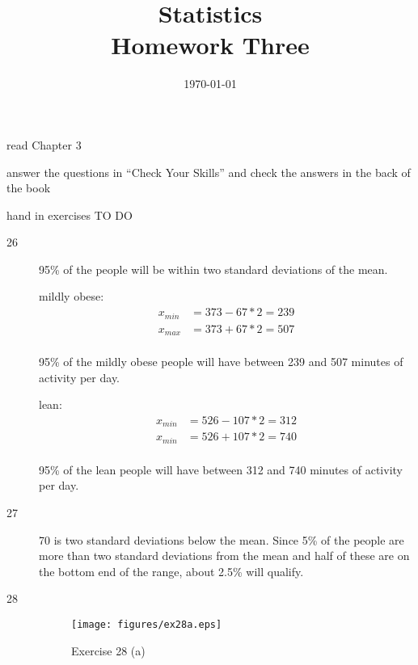 \documentclass{exam}
\author{}
\date{\today}
\title{Statistics \\ Homework Three}
\begin{document}
  \maketitle

  \ifprintanswers
  \else
    \begin{itemize*}
      \item read Chapter 3 
      \item answer the questions in ``Check Your Skills'' and check the answers in the
        back of the book
      \item hand in exercises TO DO
    \end{itemize*}
  \fi

  \ifprintanswers
    \begin{description}
      \item[26] 95\% of the people will be within two standard deviations of the mean.  

        mildly obese:
        \begin{align*}
          x_{min} &= 373 - 67 * 2 = 239 \\
          x_{max} &= 373 + 67 * 2 = 507 \\
        \end{align*}

        95\% of the mildly obese people will have between 239 and 507 minutes of activity
        per day.

        lean:
        \begin{align*}
          x_{min} &= 526 - 107 * 2 = 312 \\
          x_{min} &= 526 + 107 * 2 = 740 \\
        \end{align*}

        95\% of the lean people will have between 312 and 740 minutes of activity per day.

      \item[27]
        70 is two standard deviations below the mean.  Since 5\% of the people are more
        than two standard deviations from the mean and half of these are on the bottom end
        of the range, about 2.5\% will qualify. 

      \item[28]

        \begin{figure}[H]
          \centering
          \texttt{[image: figures/ex28a.eps]}
          \caption{Exercise 28 (a)}
        \end{figure}


\end{description}
\end{document}
